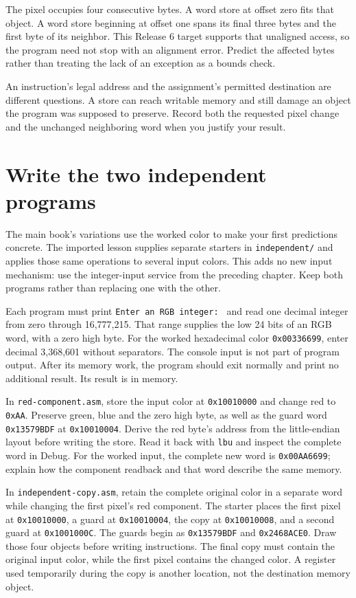 The pixel occupies four consecutive bytes. A word store at offset zero fits that
object. A word store beginning at offset one spans its final three bytes and the
first byte of its neighbor. This Release 6 target supports that unaligned access,
so the program need not stop with an alignment error. Predict the affected bytes
rather than treating the lack of an exception as a bounds check.

An instruction's legal address and the assignment's permitted destination are
different questions. A store can reach writable memory and still damage an object
the program was supposed to preserve. Record both the requested pixel change and
the unchanged neighboring word when you justify your result.

\section{Write the two independent programs}

The main book's variations use the worked color to make your first predictions
concrete. The imported lesson supplies separate starters in \texttt{independent/}
and applies those same operations to several input colors. This adds no new
input mechanism: use the integer-input service from the preceding chapter. Keep
both programs rather than replacing one with the other.

Each program must print \texttt{Enter an RGB integer: } and read one decimal
integer from zero through 16,777,215. That range supplies the low 24 bits of an
RGB word, with a zero high byte. For the worked hexadecimal color
\texttt{0x00336699}, enter decimal 3,368,601 without separators. The console input
is not part of program output. After its memory work, the program should exit
normally and print no additional result. Its result is in memory.

In \texttt{red-component.asm}, store the input color at \texttt{0x10010000}
and change red to \texttt{0xAA}. Preserve green, blue and the zero high byte, as
well as the guard word \texttt{0x13579BDF} at \texttt{0x10010004}. Derive the
red byte's address from the little-endian layout before writing the store.
Read it back with \texttt{lbu} and inspect the complete word in Debug. For the
worked input, the complete new word is \texttt{0x00AA6699}; explain how the
component readback and that word describe the same memory.

In \texttt{independent-copy.asm}, retain the complete original color in a separate
word while changing the first pixel's red component. The starter places the
first pixel at \texttt{0x10010000}, a guard at \texttt{0x10010004}, the copy at
\texttt{0x10010008}, and a second guard at \texttt{0x1001000C}. The guards begin
as \texttt{0x13579BDF} and \texttt{0x2468ACE0}. Draw those four objects before
writing instructions. The final copy must contain the original input color,
while the first pixel contains the changed color. A register used temporarily
during the copy is another location, not the destination memory object.

